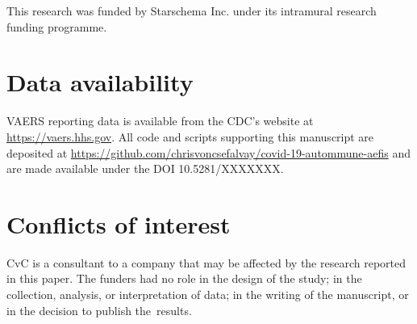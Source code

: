 \documentclass{article}
\begin{document}
This research was funded by Starschema Inc. under its intramural research funding programme.

\section*{Data availability}

VAERS reporting data is available from the CDC's website at \url{https://vaers.hhs.gov}.
All code and scripts supporting this manuscript are deposited at
\url{https://github.com/chrisvoncsefalvay/covid-19-autommune-aefis} and are made available under the DOI 10.5281/XXXXXXX.

\section*{Conflicts of interest}

CvC is a consultant to a company that may be affected by the research reported in this paper.
The funders had no role in the design of the study;
in the collection, analysis, or interpretation of data;
in the writing of the manuscript, or in the decision to publish the~results.


\end{document}
